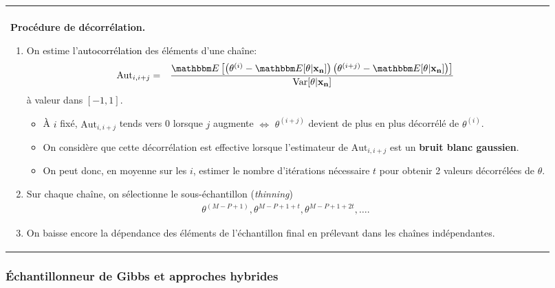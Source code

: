  \begin{center}
 \begin{tabular}{|p{}|}
    \hline\\
    {{\bf Procédure de décorrélation.}
     \begin{enumerate}
\item On estime l'\textcolor{black}{autocorrélation} des éléments d'une chaîne:
\begin{eqnarray*}
\mbox{Aut}_{i,i+j} & = & \frac{\E\left[\left(\theta^{(i)} - \E[\theta|{\bf x_n}]\right)\left(\theta^{(i+j)} - \E[\theta|{\bf x_n}]\right)\right]}{\mbox{Var}[\theta|{\bf x_n}]}
\end{eqnarray*} 
à valeur dans $[-1,1]$. 

\begin{itemize}
\item  \`A $i$ fixé, $\mbox{Aut}_{i,i+j}$ tends vers 0 lorsque $j$ augmente $\Leftrightarrow$ $\theta^{(i+j)}$ devient de plus en plus décorrélé de $\theta^{(i)}$. 
\item  On considère que cette décorrélation est effective lorsque l'estimateur de $\mbox{Aut}_{i,i+j}$ est un {\bf bruit blanc gaussien}.
\item  On peut donc, en moyenne sur les $i$, estimer le nombre d'itérations nécessaire $t$ pour obtenir 2 valeurs décorrélées de $\theta$.   
\end{itemize}


\item Sur chaque chaîne, on sélectionne le sous-échantillon ({\it thinning})
\begin{eqnarray*}
\theta^{(M-P+1)},\theta^{M-P+1+t},\theta^{M-P+1+2t},\ldots.
\end{eqnarray*}



\item On baisse encore la dépendance des éléments de l'échantillon final en prélevant dans les chaînes indépendantes. 
\end{enumerate}}  \\
\hline
    \end{tabular} 
    \end{center}
    \hspace{0.5cm}
    

\subsubsection{\'Echantillonneur de Gibbs et approches hybrides}

